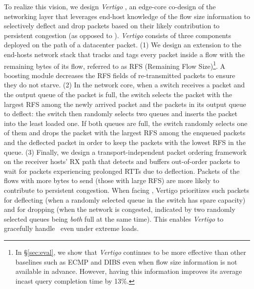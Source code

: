 To realize this vision, we design \textit{Vertigo} \cite{vertigo}, an edge-core co-design of the networking layer that leverages end-host knowledge of the flow size information to selectively deflect and drop packets based on their likely contribution to persistent congestion (as opposed to \bursts). \textit{Vertigo} consists of three components deployed on the path of a datacenter packet. (1) We design an extension to the end-hosts network stack that tracks and tags every packet inside a flow with the remaining bytes of its flow, referred to as RFS (Remaining Flow Size)\footnote{
In \S\ref{sec:eval}, we show that \textit{Vertigo} continues to be more effective than other baselines such as ECMP and DIBS \cite{dibs} even when flow size information is not available in advance. However, having this information improves its average incast query completion time by 13\%.
}. A boosting module decreases the RFS fields of re-transmitted packets to ensure they do not starve. 
 (2) In the network core, when a switch receives a packet and the output queue of the packet is full, the switch selects the packet with the largest RFS among the newly arrived packet and the packets in its output queue to deflect:
the switch then randomly selects two queues and inserts the packet into
the least loaded one. If both queues are full, the switch randomly selects one of them and drops the packet with the largest RFS among the enqueued packets and the deflected packet in order to keep the packets with the lowest RFS in the queue. (3) Finally, we design a transport-independent packet ordering framework on the receiver hosts' RX path that detects and buffers out-of-order packets to wait for packets experiencing prolonged RTTs due to deflection.
Packets of the flows with more bytes 
to send (\ie those with large RFS) are more likely to contribute to persistent congestion. When facing \bursts, Vertigo prioritizes such packets for deflecting (when a randomly selected queue in the switch has spare capacity) and for dropping (when the network is congested, indicated by two randomly selected queues being \emph{both} full at the same time). This enables \textit{Vertigo} to gracefully handle \bursts\  even under extreme loads.

